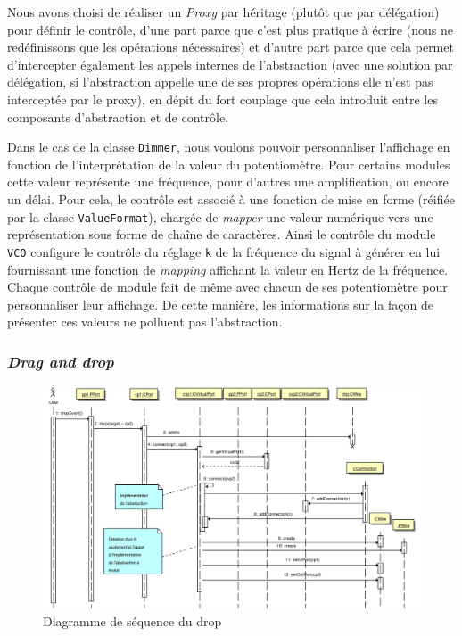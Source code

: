 Nous avons choisi de réaliser un \emph{Proxy} par héritage (plutôt
que par délégation) pour définir le contrôle, d'une part parce que
c'est plus pratique à écrire (nous ne redéfinissons que les
opérations nécessaires) et d'autre part parce que cela permet
d'intercepter également les appels internes de l'abstraction (avec
une solution par délégation, si l'abstraction appelle une de ses
propres opérations elle n’est pas interceptée par le
proxy), en dépit du fort couplage que cela introduit entre les
composants d'abstraction et de contrôle.

Dans le cas de la classe \verb!Dimmer!, nous voulons pouvoir
personnaliser l'affichage en fonction de l'interprétation de la
valeur du potentiomètre. Pour certains modules cette valeur
représente une fréquence, pour d'autres une amplification, ou
encore un délai. Pour cela, le contrôle est associé à une fonction
de mise en forme (réifiée par la classe \verb!ValueFormat!),
chargée de \emph{mapper} une valeur numérique vers une
représentation sous forme de chaîne de caractères. Ainsi le
contrôle du module \verb!VCO! configure le contrôle du réglage
\verb!k! de la fréquence du signal à générer en lui fournissant une
fonction de \emph{mapping} affichant la valeur en Hertz de la
fréquence. Chaque contrôle de module fait de même avec chacun de
ses potentiomètre pour personnaliser leur affichage. De cette
manière, les informations sur la façon de présenter ces valeurs ne
polluent pas l'abstraction.

\subsubsection{\textit{Drag and drop}}

\begin{figure}[htb]
\centering
\includegraphics[width=16cm]{../img/ps/drop-sequence.pdf}
\caption{Diagramme de séquence du drop}
\label{drop-sequence}
\end{figure}

